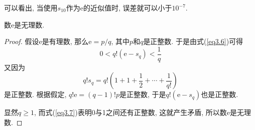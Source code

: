 \documentclass[cn,12pt,math=mtpro2,citestyle=gb7714-2015,bibstyle=gb7714-2015,twocol]{elegantbook}
\begin{document}
可以看出, 当使用$s_{10}$作为$\text{e}$的近似值时, 误差就可以小于$10^{-7}$.
\begin{theorem}
  数$\text{e}$是无理数.
\end{theorem}
\begin{proof}
  假设$\text{e}$是有理数, 那么$\text{e}=p/q$, 其中$p$和$q$是正整数. 于是由式(\ref{eq3.6})可得
  \begin{equation}\label{eq3.7}
    0<q!(\text{e}-s_q)<\frac{1}{q}
  \end{equation}
  又因为
  $$q!s_q=q!\left(1+1+\frac{1}{2}+\cdots+\frac{1}{q!}\right)$$
  是正整数. 根据假定, $q!\text{e}=(q-1)!p$是正整数, 于是$q!(\text{e}-s_q)$也是正整数.

  显然$q\geq1$, 而式(\ref{eq3.7})表明0与1之间还有正整数, 这就产生矛盾, 所以数$\text{e}$是无理数.

\end{proof}
\end{document}
